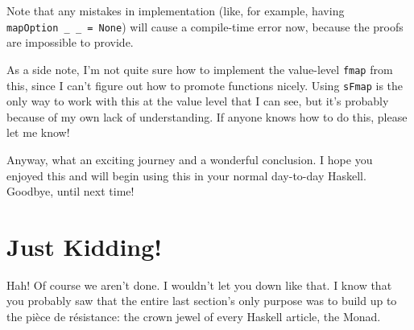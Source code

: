 \documentclass[]{article}
\begin{document}
Note that any mistakes in implementation (like, for example, having
\texttt{mapOption\ \_\ \_\ =\ None}) will cause a compile-time error now,
because the proofs are impossible to provide.

As a side note, I'm not quite sure how to implement the value-level
\texttt{fmap} from this, since I can't figure out how to promote functions
nicely. Using \texttt{sFmap} is the only way to work with this at the value
level that I can see, but it's probably because of my own lack of understanding.
If anyone knows how to do this, please let me know!

Anyway, what an exciting journey and a wonderful conclusion. I hope you enjoyed
this and will begin using this in your normal day-to-day Haskell. Goodbye, until
next time!

\section{Just Kidding!}\label{just-kidding}

Hah! Of course we aren't done. I wouldn't let you down like that. I know that
you probably saw that the entire last section's only purpose was to build up to
the pièce de résistance: the crown jewel of every Haskell article, the Monad.
\end{document}
